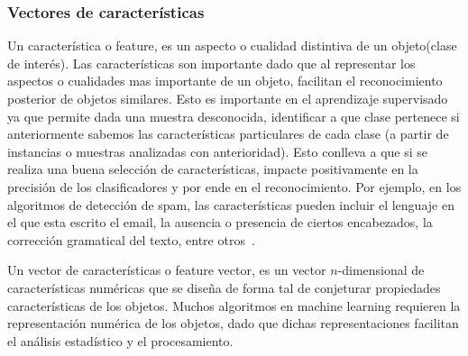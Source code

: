 \subsubsection{Vectores de características} \label{subsec:feature}

	Un característica o feature, es un aspecto o cualidad distintiva de un objeto(clase de interés). Las características son importante dado que al representar los aspectos o cualidades mas importante de un objeto, facilitan el reconocimiento posterior de objetos similares. Esto es importante en el aprendizaje supervisado ya que permite dada una muestra desconocida, identificar a que clase pertenece si anteriormente sabemos las características particulares de cada clase (a partir de instancias o muestras analizadas con anterioridad). Esto conlleva a que si se realiza una buena selección de características, impacte positivamente en la precisión de los clasificadores y por ende en el reconocimiento. Por ejemplo, en los algoritmos de detección de spam, las características pueden incluir el lenguaje en el que esta escrito el email, la ausencia o presencia de ciertos encabezados, la corrección gramatical del texto, entre otros~\cite{SpamPaper}.

	Un vector de características o feature vector, es un  vector $n$-dimensional de características numéricas que se diseña de forma tal de conjeturar propiedades características de los objetos. Muchos algoritmos en machine learning requieren la representación numérica de los objetos, dado que dichas representaciones facilitan el análisis estadístico y el procesamiento.
		
	
		
	

